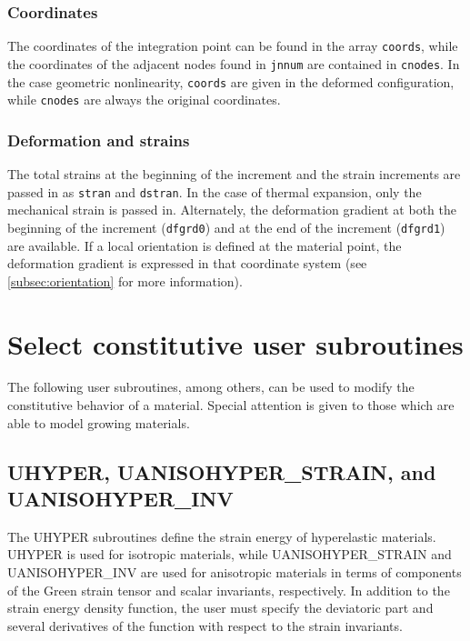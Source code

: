 \documentclass[10pt,letterpaper,oneside]{report}
\begin{document}
\subsubsection{Coordinates}
The coordinates of the integration point can be found in the array \texttt{coords}, while the coordinates of the adjacent nodes found in \texttt{jnnum} are contained in \texttt{cnodes}.  In the case geometric nonlinearity, \texttt{coords} are given in the deformed configuration, while \texttt{cnodes} are always the original coordinates.  

\subsubsection{Deformation and strains}  
The total strains at the beginning of the increment and the strain increments are passed in as \texttt{stran} and \texttt{dstran}.  In the case of thermal expansion, only the mechanical strain is passed in.  Alternately, the deformation gradient at both the beginning of the increment (\texttt{dfgrd0}) and at the end of the increment (\texttt{dfgrd1}) are available.  If a local orientation is defined at the material point, the deformation gradient is expressed in that coordinate system (see \autoref{subsec:orientation} for more information).  

\section{Select constitutive user subroutines}
The following user subroutines, among others, can be used to modify the constitutive behavior of a material.  Special attention is given to those which are able to model growing materials.

\subsection{UHYPER, UANISOHYPER\_STRAIN, and UANISOHYPER\_INV}
The UHYPER subroutines define the strain energy of hyperelastic materials.  UHYPER is used for isotropic materials, while UANISOHYPER\_STRAIN and UANISOHYPER\_INV are used for anisotropic materials in terms of components of the Green strain tensor and scalar invariants, respectively.  In addition to the strain energy density function, the user must specify the deviatoric part and several derivatives of the function with respect to the strain invariants. 
\end{document}
